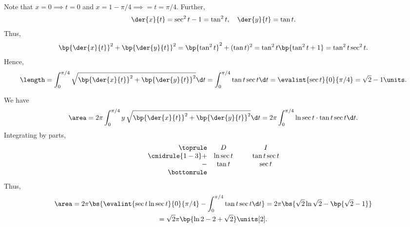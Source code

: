 \begin{solution}
\begin{ppart}
\begin{center}
        \end{center}
    \end{ppart}
    \begin{ppart}
        Note that $x = 0 \implies t = 0$ and $x = 1 - \pi/4 \implies = t = \pi/4$. Further, \[\der{x}{t} = \sec^2 t - 1 = \tan^2 t, \quad \der{y}{t} = \tan t.\] Thus, \[\bp{\der{x}{t}}^2 + \bp{\der{y}{t}}^2 = \bp{\tan^2 t}^2 + (\tan t)^2 = \tan^2 t \bp{\tan^2 t + 1} = \tan^2 t \sec^2 t.\] Hence, \[\length = \int_0^{\pi/4} \sqrt{\bp{\der{x}{t}}^2 + \bp{\der{y}{t}}^2} \d t = \int_0^{\pi/4} \tan t \sec t \d t = \evalint{\sec t}{0}{\pi/4} = \sqrt{2} - 1 \units.\]
    \end{ppart}
    \begin{ppart}
        We have \[\area = 2\pi \int_0^{\pi/4} y \, \sqrt{\bp{\der{x}{t}}^2 + \bp{\der{y}{t}}^2} \d t = 2\pi \int_0^{\pi/4} \ln \sec t \cdot \tan t \sec t \d t.\] Integrating by parts, 
        \[\begin{array}{r c @{\hspace*{1.0cm}} c}\toprule
            & D & I \\\cmidrule{1-3}
            + & \ln \sec t & \tan t \sec t \\
            - & \tan t & \sec t \\\bottomrule
        \end{array}\] Thus,
        \begin{gather*}
            \area = 2\pi \bs{\evalint{\sec t \ln \sec t}{0}{\pi/4} - \int_0^{\pi/4} \tan t \sec t \d t} = 2\pi \bs{\sqrt2 \ln \sqrt2 - \bp{\sqrt2 - 1}} \\
            = \sqrt2 \pi \bp{\ln2 - 2 + \sqrt2} \units[2].
        \end{gather*}
    \end{ppart}
\end{solution}

